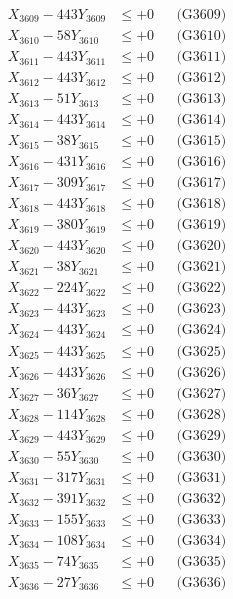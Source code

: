 \documentclass[a4paper,10pt]{article}
\begin{document}
{\begin{align}
X_{3609} - 443Y_{3609} &\leq +0 && \text{(G3609)} \\
X_{3610} - 58Y_{3610} &\leq +0 && \text{(G3610)} \\
\allowbreak
X_{3611} - 443Y_{3611} &\leq +0 && \text{(G3611)} \\
X_{3612} - 443Y_{3612} &\leq +0 && \text{(G3612)} \\
X_{3613} - 51Y_{3613} &\leq +0 && \text{(G3613)} \\
X_{3614} - 443Y_{3614} &\leq +0 && \text{(G3614)} \\
X_{3615} - 38Y_{3615} &\leq +0 && \text{(G3615)} \\
X_{3616} - 431Y_{3616} &\leq +0 && \text{(G3616)} \\
X_{3617} - 309Y_{3617} &\leq +0 && \text{(G3617)} \\
X_{3618} - 443Y_{3618} &\leq +0 && \text{(G3618)} \\
X_{3619} - 380Y_{3619} &\leq +0 && \text{(G3619)} \\
X_{3620} - 443Y_{3620} &\leq +0 && \text{(G3620)} \\
\allowbreak
X_{3621} - 38Y_{3621} &\leq +0 && \text{(G3621)} \\
X_{3622} - 224Y_{3622} &\leq +0 && \text{(G3622)} \\
X_{3623} - 443Y_{3623} &\leq +0 && \text{(G3623)} \\
X_{3624} - 443Y_{3624} &\leq +0 && \text{(G3624)} \\
X_{3625} - 443Y_{3625} &\leq +0 && \text{(G3625)} \\
X_{3626} - 443Y_{3626} &\leq +0 && \text{(G3626)} \\
X_{3627} - 36Y_{3627} &\leq +0 && \text{(G3627)} \\
X_{3628} - 114Y_{3628} &\leq +0 && \text{(G3628)} \\
X_{3629} - 443Y_{3629} &\leq +0 && \text{(G3629)} \\
X_{3630} - 55Y_{3630} &\leq +0 && \text{(G3630)} \\
\allowbreak
X_{3631} - 317Y_{3631} &\leq +0 && \text{(G3631)} \\
X_{3632} - 391Y_{3632} &\leq +0 && \text{(G3632)} \\
X_{3633} - 155Y_{3633} &\leq +0 && \text{(G3633)} \\
X_{3634} - 108Y_{3634} &\leq +0 && \text{(G3634)} \\
X_{3635} - 74Y_{3635} &\leq +0 && \text{(G3635)} \\
X_{3636} - 27Y_{3636} &\leq +0 && \text{(G3636)} \\

\end{align}}
\end{document}
